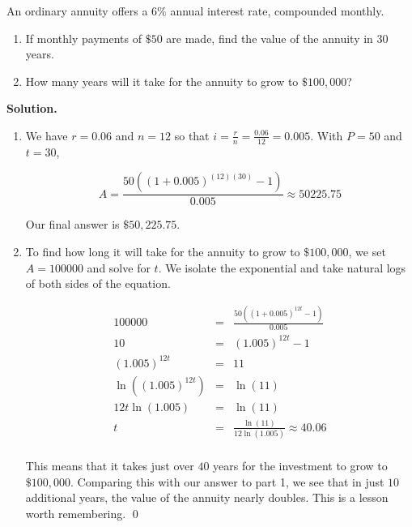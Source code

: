 \documentclass{ximera}
\begin{document}
\begin{example} \label{annuityex}  An ordinary annuity offers a $6 \%$ annual interest rate, compounded monthly.

\begin{enumerate}

\item  If monthly payments of $\$50$ are made, find the value of the annuity in $30$ years.

\item  How many  years will it take for the  annuity to grow to  $\$100,\! 000$?

\end{enumerate}

{\bf Solution.}

\begin{enumerate}

\item We have $r = 0.06$ and $n = 12$ so that $i = \frac{r}{n} = \frac{0.06}{12} = 0.005$.  With $P=50$ and  $t=30$,  

\[A = \frac{50\left((1+0.005)^{(12)(30)} - 1\right)}{0.005} \approx  50225.75\]

Our final answer is $\$50,\!225.75$.

\item To find how long it will take for the annuity to grow to $\$100,\!000$, we set $A = 100000$ and solve for $t$.  We isolate the exponential and take natural logs of both sides of the equation.

\[ \begin{array}{rcl}

100000 & = &  \frac{50\left((1+0.005)^{12t} - 1\right)}{0.005} \\  

10 & = &  (1.005)^{12t} - 1 \\   

(1.005)^{12t} & = &  11 \\  

\ln\left((1.005)^{12t}\right) & = & \ln(11) \\  

12t \ln(1.005) & = & \ln(11) \\  

t & = & \frac{\ln(11)}{12 \ln(1.005)} \approx 40.06 \\

\end{array} \]

This means that it takes just over $40$ years for the investment to grow to $\$100,\!000$.  Comparing this with our answer to part 1, we see that in just $10$ additional years, the value of the annuity nearly doubles. This is a lesson worth remembering.  \qed 

\end{enumerate}

\end{example}
\end{document}
